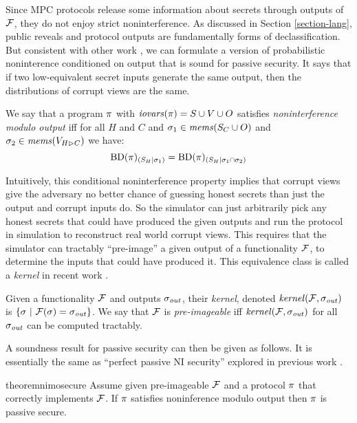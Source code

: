 Since MPC protocols release some information about secrets through
outputs of $\mathcal{F}$, they do not enjoy strict noninterference.  As
discussed in Section \ref{section-lang}, public reveals and protocol
outputs are fundamentally forms of declassification.  But consistent
with other work \cite{8429300}, we can formulate a version of
probabilistic noninterence conditioned on output that is sound
for passive security. It says that if two low-equivalent secret
inputs generate the same output, then the distributions of corrupt
views are the same. 
\begin{definition}
  \label{definition-NIMO}
  We say that a program $\pi$ with $\mathit{iovars}(\pi) = S \cup V \cup O$
  satisfies \emph{noninterference modulo output}
  iff for all $H$ and $C$ and $\sigma_1 \in \mathit{mems}(S_C \cup O)$ and $\sigma_2 \in \mathit{mems}(V_{H \rhd C})$
  we have:
  $$
  \mathrm{BD}(\pi)_{({S_H}|{\sigma_1})} = \mathrm{BD}(\pi)_{({S_H}|{\sigma_1 \cap \sigma_2})}
 $$
\end{definition}
Intuitively, this conditional noninterference property implies that
corrupt views give the adversary no better chance of guessing honest
secrets than just the output and corrupt inputs do. So the simulator
can just arbitrarily pick any honest secrets that could have produced
the given outputs and run the protocol in simulation to reconstruct
real world corrupt views. This requires that the simulator can
tractably ``pre-image'' a given output of a functionality $\mathcal{F}$,
to determine the inputs that could have produced it. This equivalence
class is called a \emph{kernel} in recent work \cite{10.1145/3571740}.
\begin{definition}
  Given a functionality $\mathcal{F}$ and outputs $\sigma_{\mathit{out}}$, their 
  \emph{kernel}, denoted $\mathit{kernel}(\mathcal{F},\sigma_{\mathit{out}})$ is
  $
  \{ \sigma\ |\ \mathcal{F}(\sigma) = \sigma_{\mathit{out}} \}
  $.
  We say that $\mathcal{F}$ is \emph{pre-imageable} iff $\mathit{kernel}(\mathcal{F}, \sigma_{\mathit{out}})$ for all
  $\sigma_{\mathit{out}}$ can be computed tractably.
\end{definition}
A soundness result for passive security can then be given as follows.
It is essentially the same as ``perfect passive NI security'' explored
in previous work \cite{8429300}.  
\begin{restatable}{theorem}{nimosecure}
  \label{theorem-nimo}
  Assume given pre-imageable $\mathcal{F}$ and a protocol $\pi$ that
  correctly implements $\mathcal{F}$.  If $\pi$ satisfies noninference modulo output
  then $\pi$ is passive secure.
\end{restatable}



